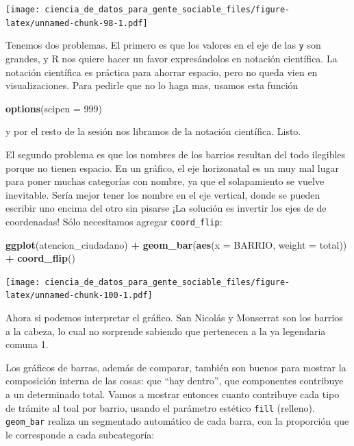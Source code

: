 \documentclass[spanish,]{book}
\newenvironment{Shaded}{\begin{snugshade}}{\end{snugshade}}
\newcommand{\DataTypeTok}[1]{\textcolor[rgb]{0.13,0.29,0.53}{#1}}
\newcommand{\DecValTok}[1]{\textcolor[rgb]{0.00,0.00,0.81}{#1}}
\newcommand{\KeywordTok}[1]{\textcolor[rgb]{0.13,0.29,0.53}{\textbf{#1}}}
\newcommand{\NormalTok}[1]{#1}
\newcommand{\OperatorTok}[1]{\textcolor[rgb]{0.81,0.36,0.00}{\textbf{#1}}}
\newcommand{\StringTok}[1]{\textcolor[rgb]{0.31,0.60,0.02}{#1}}
\begin{document}
\texttt{[image: ciencia\_de\_datos\_para\_gente\_sociable\_files/figure-latex/unnamed-chunk-98-1.pdf]}

Tenemos dos problemas. El primero es que los valores en el eje de las \texttt{y} son grandes, y R nos quiere hacer un favor expresándolos en notación científica. La notación científica es práctica para ahorrar espacio, pero no queda vien en visualizaciones. Para pedirle que no lo haga mas, usamos esta función

\begin{Shaded}
\begin{Highlighting}[]
\KeywordTok{options}\NormalTok{(}\DataTypeTok{scipen =} \DecValTok{999}\NormalTok{)}
\end{Highlighting}
\end{Shaded}

y por el resto de la sesión nos libramos de la notación científica. Listo.

El segundo problema es que los nombres de los barrios resultan del todo ilegibles porque no tienen espacio. En un gráfico, el eje horizonatal es un muy mal lugar para poner muchas categorías con nombre, ya que el solapamiento se vuelve inevitable. Sería mejor tener los nombre en el eje vertical, donde se pueden escribir uno encima del otro sin pisarse ¡La solución es invertir los ejes de de coordenadas! Sólo necesitamos agregar \texttt{coord\_flip}:

\begin{Shaded}
\begin{Highlighting}[]
\KeywordTok{ggplot}\NormalTok{(atencion_ciudadano) }\OperatorTok{+}
\StringTok{    }\KeywordTok{geom_bar}\NormalTok{(}\KeywordTok{aes}\NormalTok{(}\DataTypeTok{x =}\NormalTok{ BARRIO, }\DataTypeTok{weight =}\NormalTok{ total)) }\OperatorTok{+}
\StringTok{    }\KeywordTok{coord_flip}\NormalTok{()}
\end{Highlighting}
\end{Shaded}

\texttt{[image: ciencia\_de\_datos\_para\_gente\_sociable\_files/figure-latex/unnamed-chunk-100-1.pdf]}

Ahora si podemos interpretar el gráfico. San Nicolás y Monserrat son los barrios a la cabeza, lo cual no sorprende sabiendo que pertenecen a la ya legendaria comuna 1.

Los gráficos de barras, además de comparar, también son buenos para mostrar la composición interna de las cosas: que ``hay dentro'', que componentes contribuye a un determinado total. Vamos a mostrar entonces cuanto contribuye cada tipo de trámite al toal por barrio, usando el parámetro estético \texttt{fill} (relleno). \texttt{geom\_bar} realiza un segmentado automático de cada barra, con la proporción que le corresponde a cada subcategoría:
\end{document}
